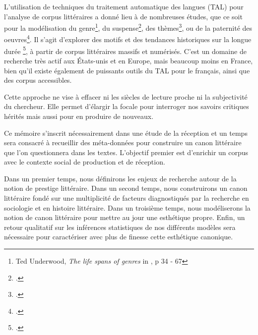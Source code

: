 L'utilisation de techniques du traitement automatique des langues (TAL) pour l'analyse de corpus littéraires a donné lieu à de nombreuses études, que ce soit pour la modélisation du genre\footnote{Ted Underwood, \textit{The life spans of genres} in \cite{underwood_distant_2019}, p 34 - 67}, du suspense\footcites{piper_narrativity_2021}, des thèmes\footcites{jockers_significant_2013}, ou de la paternité des oeuvres\footcites{cafiero2021psyche}. Il s'agit d'explorer des motifs et des tendances historiques sur la longue durée \footcites{braudel_mediterranee_2017}, à partir de corpus littéraires massifs et numérisés. C'est un domaine de recherche très actif aux États-unis et en Europe, mais beaucoup moins en France, bien qu'il existe également de puissants outils du TAL pour le français, ainsi que des corpus accessibles.

Cette approche ne vise à effacer ni les siècles de lecture proche ni la subjectivité du chercheur. Elle permet d'élargir la focale pour interroger nos savoirs critiques hérités mais aussi pour en produire de nouveaux. 

Ce mémoire s'inscrit nécessairement dans une étude de la réception et un temps sera consacré à recueillir des méta-données pour construire un canon littéraire que l'on questionnera dans les textes. L'objectif premier est d'enrichir un corpus avec le contexte social de production et de réception. 

Dans un premier temps, nous définirons les enjeux de recherche autour de la notion de prestige littéraire. Dans un second temps, nous construirons un canon littéraire fondé sur une multiplicité de facteurs diagnostiqués par la recherche en sociologie et en histoire littéraire. Dans un troisième temps, nous modéliserons la notion de canon littéraire pour mettre au jour une esthétique propre. Enfin, un retour qualitatif sur les inférences statistiques de nos différents modèles sera nécessaire pour caractériser avec plus de finesse cette esthétique canonique.